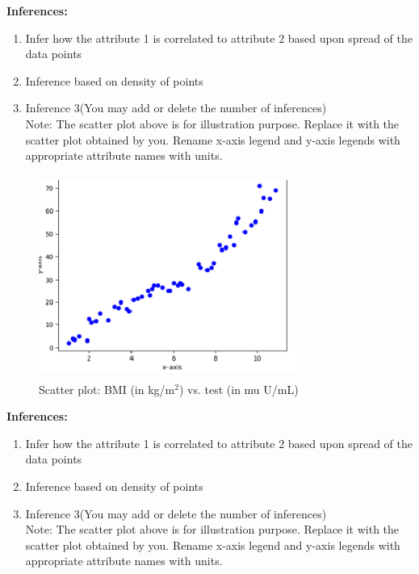 \documentclass[12 pt, a4paper]{article}
\theoremstyle{definition}
\begin{document}
\textbf{\Large Inferences:}
\begin{enumerate}
   \item Infer how the attribute 1 is correlated to attribute 2 based upon spread of the data points
   \item Inference based on density of points
   \item Inference 3(You may add or delete the number of inferences)
\\Note: The scatter plot above is for illustration purpose. Replace it with the scatter plot obtained by you. Rename x-axis legend and y-axis legends with appropriate attribute names with units.

\end{enumerate}

\begin{figure}[H]
	\centering
	\includegraphics[width=8.5cm,height=6.65cm]{Scatter Plot.png}
	\caption{Scatter plot: BMI (in kg/m$^{2 }$) vs. test (in mu U/mL)}
	\label{Blockdia}
\end{figure}

\textbf{\Large Inferences:}
\begin{enumerate}
   \item Infer how the attribute 1 is correlated to attribute 2 based upon spread of the data points
   \item Inference based on density of points
   \item Inference 3(You may add or delete the number of inferences)
\\Note: The scatter plot above is for illustration purpose. Replace it with the scatter plot obtained by you. Rename x-axis legend and y-axis legends with appropriate attribute names with units.

\end{enumerate}
\end{document}
